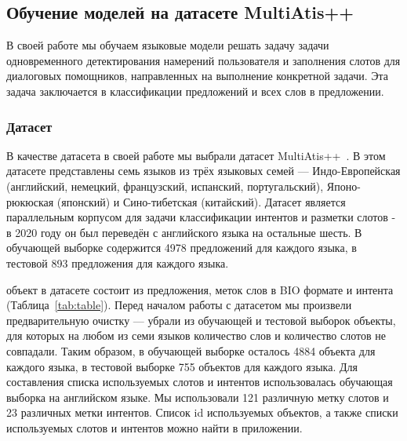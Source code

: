 \subsection{Обучение моделей на датасете MultiAtis++}
В своей работе мы обучаем языковые модели решать задачу задачи одновременного детектирования намерений пользователя и заполнения слотов для диалоговых помощников, направленных на выполнение конкретной задачи.
Эта задача заключается в классификации предложений и всех слов в предложении.

\subsubsection{Датасет}
В качестве датасета в своей работе мы выбрали датасет MultiAtis++~\cite{Xu2020EndtoEndSA}.
В этом датасете представлены семь языков из трёх языковых семей —
Индо-Европейская (английский, немецкий, французский, испанский, португальский), Японо-рюкюская (японский) и Сино-тибетская (китайский).
Датасет является параллельным корпусом для задачи классификации интентов и разметки слотов - в 2020 году он был переведён с английского языка на остальные шесть.
В обучающей выборке содержится 4978 предложений для каждого языка, в тестовой 893 предложения для каждого языка.

\begin{table}[H]
    \caption{Пример объекта из датасета MultiAtis++. На примере представлен объект на английском и немецком языке.}\label{tab:table}
\end{table}
 объект в датасете состоит из предложения, меток слов в BIO формате и интента (Таблица~\eqref{tab:table}).
Перед началом работы с датасетом мы произвели предварительную очистку —
убрали из обучающей и тестовой выборок объекты, для которых на любом из семи языков количество слов и количество слотов не совпадали.
Таким образом, в обучающей выборке осталось 4884 объекта для каждого языка, в тестовой выборке 755 объектов для каждого языка.
Для составления списка используемых слотов и интентов использовалась обучающая выборка на английском языке.
Мы использовали 121 различную метку слотов и 23 различных метки интентов.
Список id используемых объектов, а также списки используемых слотов и интентов можно найти в приложении.

